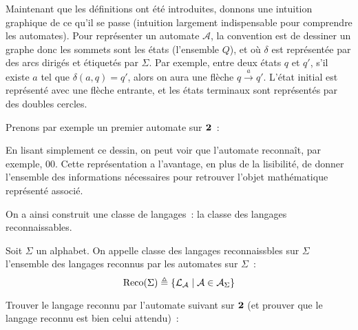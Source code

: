 Maintenant que les définitions ont été introduites, donnons une intuition
graphique de ce qu'il se passe (intuition largement indispensable pour
comprendre les automates). Pour représenter un automate $\mathcal A$, la
convention est de dessiner un graphe donc les sommets sont les états (l'ensemble
$Q$), et où $\delta$ est représentée par des arcs dirigés et étiquetés par
$\Sigma$. Par exemple, entre deux états $q$ et $q'$, s'il existe $a$ tel que
$\delta(a,q) = q'$, alors on aura une flèche $q \xrightarrow{a} q'$. L'état
initial est représenté avec une flèche entrante, et les états terminaux sont
représentés par des doubles cercles.

Prenons par exemple un premier automate sur $\boldsymbol{2}$~:

\begin{figure}[h]
  \centering
\end{figure}

En lisant simplement ce dessin, on peut voir que l'automate reconnaît, par
exemple, $00$. Cette représentation a l'avantage, en plus de la lisibilité,
de donner l'ensemble des informations nécessaires pour retrouver l'objet
mathématique représenté associé.

On a ainsi construit une classe de langages~: la classe des langages
reconnaissables.

\begin{definition}
  Soit $\Sigma$ un alphabet. On appelle classe des langages reconnaissbles sur
  $\Sigma$ l'ensemble des langages reconnus par les automates sur $\Sigma$~:
  \[\operatorname{Reco}(\Sigma) \triangleq \{\mathcal L_\mathcal A \mid
  \mathcal A \in \mathcal A_\Sigma\}\]
\end{definition}

\begin{exercise}
  Trouver le langage reconnu par l'automate suivant sur $\boldsymbol{2}$ (et prouver que
  le langage reconnu est bien celui attendu)~:
  \begin{figure}[h]
    \centering
  \end{figure}
\end{exercise}

